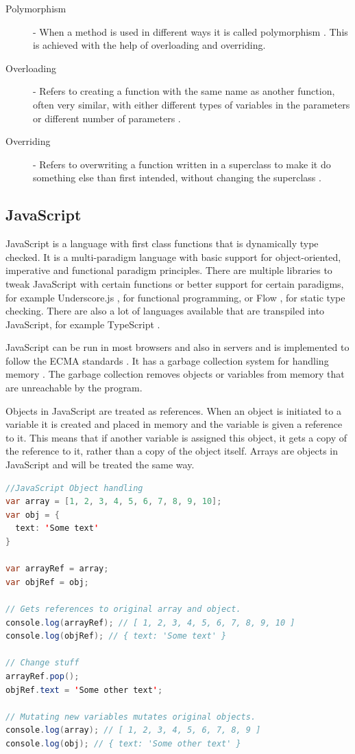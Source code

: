 \documentclass {article}
\begin{document}
\begin{description}
\item [Polymorphism] - When a method is used in different ways it is called polymorphism \cite{gabmar, skansholm}. This is achieved with the help of overloading and overriding.

\item[Overloading] - Refers to creating a function with the same name as another function, often very similar, with either different types of variables in the parameters or different number of parameters \cite{skansholm}.

\item[Overriding] - Refers to overwriting a function written in a superclass to make it do something else than first intended, without changing the superclass \cite{skansholm}.
\end{description}
\subsection{JavaScript}
\label{sec:javascript}
JavaScript is a language with first class functions that is dynamically type checked. It is a multi-paradigm language with basic support for object-oriented, imperative and functional paradigm principles. There are multiple libraries to tweak JavaScript with certain functions or better support for certain paradigms, for example Underscore.js \cite{underscorejs}, for functional programming, or Flow \cite{flow}, for static type checking. There are also a lot of languages available that are transpiled into JavaScript, for example TypeScript \cite{typescript}. 

JavaScript can be run in most browsers and also in servers and is implemented to follow the ECMA standards \cite{ecma6table}. It has a garbage collection system for handling memory \cite{mozillamem}. The garbage collection removes objects or variables from memory that are unreachable by the program. 

Objects in JavaScript are treated as references. When an object is initiated to a variable it is created and placed in memory and the variable is given a reference to it. This means that if another variable is assigned this object, it gets a copy of the reference to it, rather than a copy of the object itself. Arrays are objects in JavaScript and will be treated the same way.

\begin{lstlisting}[language=Java, breaklines=true]
//JavaScript Object handling
var array = [1, 2, 3, 4, 5, 6, 7, 8, 9, 10];
var obj = {
  text: 'Some text'
}

var arrayRef = array;
var objRef = obj;

// Gets references to original array and object.
console.log(arrayRef); // [ 1, 2, 3, 4, 5, 6, 7, 8, 9, 10 ]
console.log(objRef); // { text: 'Some text' }

// Change stuff
arrayRef.pop();
objRef.text = 'Some other text';

// Mutating new variables mutates original objects.
console.log(array); // [ 1, 2, 3, 4, 5, 6, 7, 8, 9 ]
console.log(obj); // { text: 'Some other text' }
\end{lstlisting}
\end{document}

